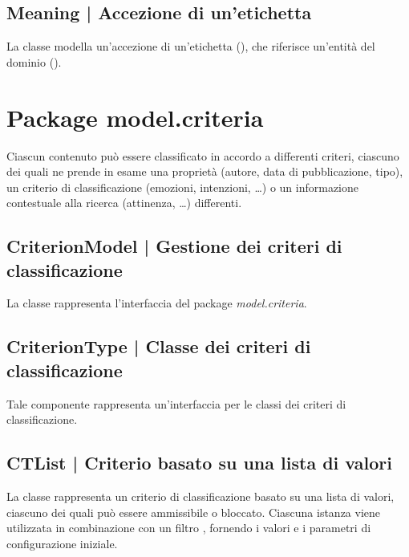\documentclass[10pt,a4paper,headinclude,footinclude,hidelinks]{scrreprt} %
\begin{document}
	\subsection[Meaning]{Meaning | Accezione di un'etichetta}
	\label{sec:stage:design:model:meaning}
	La classe modella un'accezione di un'etichetta (\textit{}), che riferisce un'entità del dominio (\textit{}).

	\section{Package model.criteria}
	\label{sec:stage:design:model.criteria}
	Ciascun contenuto può essere classificato in accordo a differenti criteri, ciascuno dei quali ne prende in esame una proprietà (autore, data di pubblicazione, tipo), un criterio di classificazione (emozioni, intenzioni, \ldots) o un informazione contestuale alla ricerca (attinenza, \ldots) differenti.

	\subsection[CriterionModel]{CriterionModel | Gestione dei criteri di classificazione}
	\label{sec:stage:design:model.criteria:criteria-model}
	La classe \textit{} rappresenta l'interfaccia del package \textit{model.criteria}.

	\subsection[CriterionType]{CriterionType | Classe dei criteri di classificazione}
	\label{sec:stage:design:model.criteria:criteria}
	Tale componente rappresenta un'interfaccia per le classi dei criteri di classificazione.

	\subsection[CTList]{CTList | Criterio basato su una lista di valori}
	\label{sec:stage:design:model.criteria:list-criterion}
	La classe \textit{} rappresenta un criterio di classificazione basato su una lista di valori, ciascuno dei quali può essere ammissibile o bloccato. Ciascuna istanza viene utilizzata in combinazione con un filtro \textit{}, fornendo i valori e i parametri di configurazione iniziale.
\end{document}
